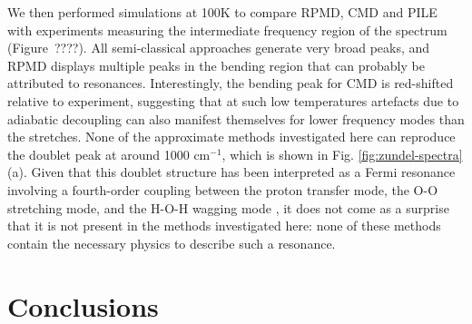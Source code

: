 \documentclass[aps,prb,superscriptaddress,amsmath,amssymb,showpacs,twocolumn]{revtex4}
\begin{document}
We then performed simulations at 100K to compare RPMD, CMD and PILE with experiments
measuring the intermediate frequency region of the spectrum~\cite{AsmisScience2003} (Figure~????). 
All semi-classical approaches generate very broad peaks, and RPMD 
displays multiple peaks in the bending region that can probably be attributed to resonances.
Interestingly, the bending peak for CMD is red-shifted relative to experiment, suggesting 
that at such low temperatures artefacts due to adiabatic decoupling can also manifest themselves 
for lower frequency modes than the stretches. 
None of the approximate methods investigated here can reproduce the
doublet peak at around 1000 cm$^{-1}$, which is shown in Fig. \ref{fig:zundel-spectra}(a).
Given that this doublet structure has been interpreted as a Fermi resonance
involving a fourth-order coupling between the proton transfer mode,
the O-O stretching mode, and the H-O-H wagging mode \cite{VendrellMeyer2007, Schatteburg2008},
it does not come as a surprise that it is not present in the methods investigated here:
none of these methods contain the necessary physics to describe such a resonance.



\section{Conclusions}









\end{document}
